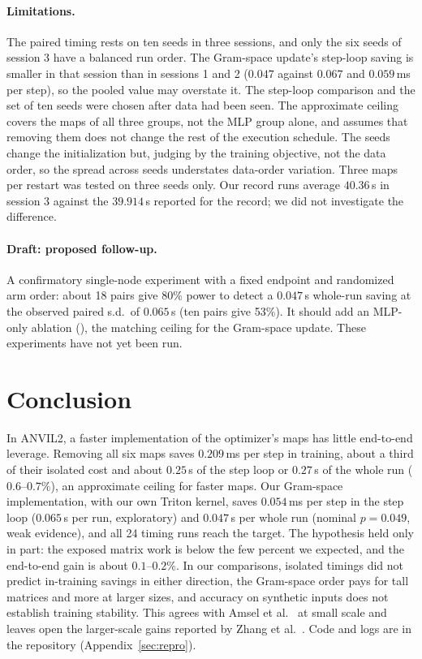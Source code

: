 \documentclass{article}
\begin{document}
\paragraph{Limitations.}
The paired timing rests on ten seeds in three sessions, and only the six seeds of session 3 have a balanced run order. The Gram-space update's step-loop saving is smaller in that session than in sessions 1 and 2 ($0.047$ against $0.067$ and $0.059$\,ms per step), so the pooled value may overstate it. The step-loop comparison and the set of ten seeds were chosen after data had been seen. The approximate ceiling covers the maps of all three groups, not the MLP group alone, and assumes that removing them does not change the rest of the execution schedule. The seeds change the initialization but, judging by the training objective, not the data order, so the spread across seeds understates data-order variation. Three maps per restart was tested on three seeds only. Our record runs average $40.36$\,s in session 3 against the $39.914$\,s reported for the record; we did not investigate the difference.

\paragraph{Draft: proposed follow-up.} A confirmatory single-node experiment with a fixed endpoint and randomized arm order: about 18 pairs give 80\% power to detect a $0.047$\,s whole-run saving at the observed paired s.d.\ of $0.065$\,s (ten pairs give 53\%). It should add an MLP-only ablation (), the matching ceiling for the Gram-space update. These experiments have not yet been run.

\section{Conclusion}\label{sec:concl}
In ANVIL2, a faster implementation of the optimizer's maps has little end-to-end leverage. Removing all six maps saves $0.209$\,ms per step in training, about a third of their isolated cost and about $0.25$\,s of the step loop or $0.27$\,s of the whole run ($0.6$--$0.7\%$), an approximate ceiling for faster maps. Our Gram-space implementation, with our own Triton kernel, saves $0.054$\,ms per step in the step loop ($0.065$\,s per run, exploratory) and $0.047$\,s per whole run (nominal $p=0.049$, weak evidence), and all 24 timing runs reach the target. The hypothesis held only in part: the exposed matrix work is below the few percent we expected, and the end-to-end gain is about $0.1$--$0.2\%$. In our comparisons, isolated timings did not predict in-training savings in either direction, the Gram-space order pays for tall matrices and more at larger sizes, and accuracy on synthetic inputs does not establish training stability. This agrees with Amsel et al.~\cite{polar} at small scale and leaves open the larger-scale gains reported by Zhang et al.~\cite{gramns}. Code and logs are in the repository (Appendix~\ref{sec:repro}).
\end{document}
